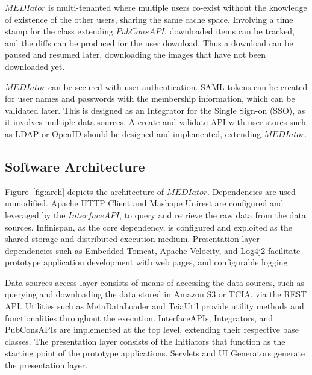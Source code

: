\documentclass[letterpaper, 10 pt, conference]{ieeeconf}  %
\begin{document}
$MEDIator$ is multi-tenanted where multiple users co-exist without the knowledge of existence of the other users, sharing the same cache space. Involving a time stamp for the class extending $PubConsAPI$, downloaded items can be tracked, and the diffs can be produced for the user download. Thus a download can be paused and resumed later, downloading the images that have not been downloaded yet.

$MEDIator$ can be secured with user authentication. SAML tokens can be created for user names and passwords with the membership information, which can be validated later. This is designed as an Integrator for the Single Sign-on (SSO), as it involves multiple data sources. A create and validate API with user stores such as LDAP or OpenID should be designed and implemented, extending $MEDIator$.

\subsection{Software Architecture}
Figure~\ref{fig:arch} depicts the architecture of $MEDIator$. Dependencies are used unmodified. Apache HTTP Client and Mashape Unirest are configured and leveraged by the $InterfaceAPI$, to query and retrieve the raw data from the data sources. Infinispan, as the core dependency, is configured and exploited as the shared storage and distributed execution medium. Presentation layer dependencies such as Embedded Tomcat, Apache Velocity, and Log4j2 facilitate prototype application development with web pages, and configurable logging.


Data sources access layer consists of means of accessing the data sources, such as querying and downloading the data stored in Amazon S3 or TCIA, via the REST API. Utilities such as MetaDataLoader and TciaUtil provide utility methods and functionalities throughout the execution. InterfaceAPIs, Integrators, and PubConsAPIs are implemented at the top level, extending their respective base classes. The presentation layer consists of the Initiators that function as the starting point of the prototype applications. Servlets and UI Generators generate the presentation layer. 
\end{document}
